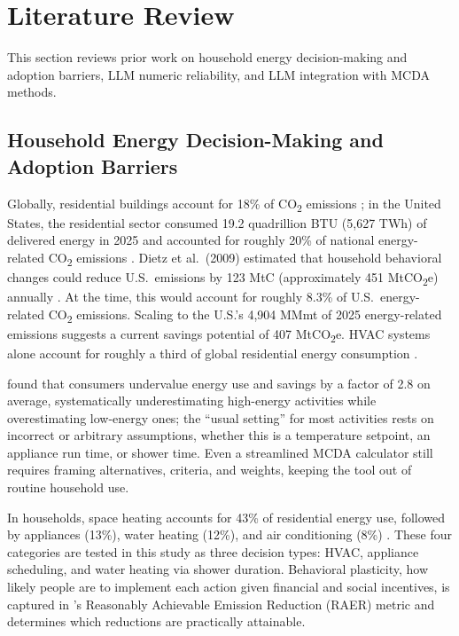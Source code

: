 \documentclass[final,3p,times]{elsarticle}
\begin{document}
\section{Literature Review}
\label{sec:lit-review}
This section reviews prior work on household energy decision-making and adoption barriers, LLM numeric reliability, and LLM integration with MCDA methods.

\subsection{Household Energy Decision-Making and Adoption Barriers}

Globally, residential buildings account for 18\% of CO\textsubscript{2} emissions \cite{GONZALEZTORRES2022112428}; in the United States, the residential sector consumed 19.2 quadrillion BTU (5,627 TWh) of delivered energy in 2025 and accounted for roughly 20\% of national energy-related CO\textsubscript{2} emissions \cite{eia2022}. Dietz et al.\ (2009) estimated that household behavioral changes could reduce U.S.\ emissions by 123 MtC (approximately 451 MtCO\textsubscript{2}e) annually \cite{dietz2009}. At the time, this would account for roughly 8.3\% of U.S.\ energy-related CO\textsubscript{2} emissions. Scaling to the U.S.'s 4{,}904 MMmt of 2025 energy-related emissions \cite{eia_co2_2025} suggests a current savings potential of 407 MtCO\textsubscript{2}e. HVAC systems alone account for roughly a third of global residential energy consumption \cite{GONZALEZTORRES2022112428}.

\citet{attari2010} found that consumers undervalue energy use and savings by a factor of 2.8 on average, systematically underestimating high-energy activities while overestimating low-energy ones; the ``usual setting'' for most activities rests on incorrect or arbitrary assumptions, whether this is a temperature setpoint, an appliance run time, or shower time. Even a streamlined MCDA calculator \cite{huang2011,huangburgherr2024} still requires framing alternatives, criteria, and weights, keeping the tool out of routine household use.

In households, space heating accounts for 43\% of residential energy use, followed by appliances (13\%), water heating (12\%), and air conditioning (8\%) \cite{eia_recs2020}. These four categories are tested in this study as three decision types: HVAC, appliance scheduling, and water heating via shower duration. Behavioral plasticity, how likely people are to implement each action given financial and social incentives, is captured in \citet{dietz2009}'s Reasonably Achievable Emission Reduction (RAER) metric and determines which reductions are practically attainable.
\end{document}

